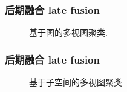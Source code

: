 \begin{frame}
    \frametitle{后期融合 late fusion}
    \begin{figure}[!ht]
\begin{center}
{
\centering
{}
\caption{基于图的多视图聚类.}
\label{figure_evaluation_objective one}
}
\end{center}
\end{figure}
\end{frame}

\begin{frame}
    \frametitle{后期融合 late fusion}
    \begin{figure}[!ht]
\begin{center}
{
\centering
{}
\caption{基于子空间的多视图聚类}
\label{figure_evaluation_objective one}
}
\end{center}
\end{figure}
\end{frame}

